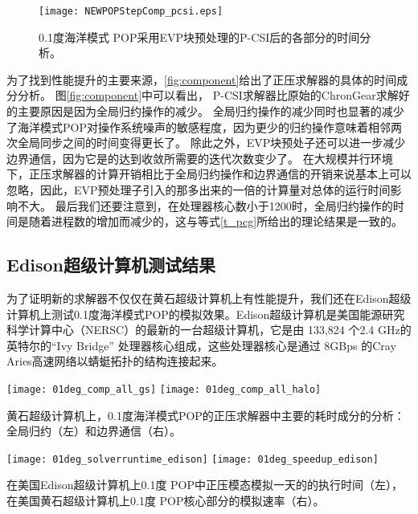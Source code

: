 \begin {figure}[t!]
\centering

\texttt{[image: NEWPOPStepComp\_pcsi.eps]}
\caption[] { 0.1度海洋模式 POP采用EVP块预处理的P-CSI后的各部分的时间分析。 \label{fig:StepComp_pcsi}}
\end{figure}



为了找到性能提升的主要来源，\ref{fig:component}给出了正压求解器的具体的时间成分分析。 
图\ref{fig:component}中可以看出， P-CSI求解器比原始的ChronGear求解好的主要原因是因为全局归约操作的减少。 
全局归约操作的减少同时也显著的减少了海洋模式POP对操作系统噪声的敏感程度\cite{ferreira}，因为更少的归约操作意味着相邻两次全局同步之间的时间变得更长了。 
除此之外，EVP块预处子还可以进一步减少边界通信，因为它是的达到收敛所需要的迭代次数变少了。 
在大规模并行环境下，正压求解器的计算开销相比于全局归约操作和边界通信的开销来说基本上可以忽略，因此，EVP预处理子引入的那多出来的一倍的计算量对总体的运行时间影响不大。
最后我们还要注意到，在处理器核心数小于1200时，全局归约操作的时间是随着进程数的增加而减少的，这与等式\ref{t_pcg}所给出的理论结果是一致的。

 

\subsection{Edison超级计算机测试结果}
 
为了证明新的求解器不仅仅在黄石超级计算机上有性能提升，我们还在Edison超级计算机上测试0.1度海洋模式POP的模拟效果。Edison超级计算机是美国能源研究科学计算中心（NERSC）的最新的一台超级计算机，它是由 133,824 个2.4 GHz的英特尔的``Ivy Bridge'' 处理器核心组成，这些处理器核心是通过 8GBps 的Cray
Aries高速网络以蜻蜓拓扑的结构连接起来。  
\begin {figure*}[t!]
\begin{center}
\texttt{[image: 01deg\_comp\_all\_gs]}
\hspace{10pt}
\texttt{[image: 01deg\_comp\_all\_halo]}
\end{center}
\caption[] {黄石超级计算机上，0.1度海洋模式POP的正压求解器中主要的耗时成分的分析：全局归约（左）和边界通信（右）。  }
\label{fig:component}
\end {figure*}
\begin {figure*}[t!]
\begin{center}
\texttt{[image: 01deg\_solverruntime\_edison]}
\hspace{10pt}
\texttt{[image: 01deg\_speedup\_edison]}
\end{center}
 
\caption []{在美国Edison超级计算机上0.1度 POP中正压模态模拟一天的的执行时间（左）， 
在美国黄石超级计算机上0.1度 POP核心部分的模拟速率（右）。\label {fig:runtime01_edison}}
 
\end {figure*}

